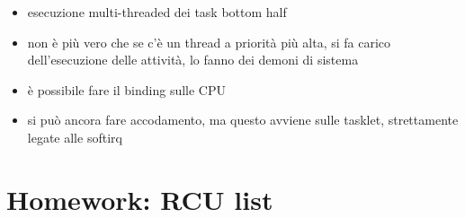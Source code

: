 \documentclass[12pt, oneside]{extbook}
\begin{document}
\begin{itemize}
\item esecuzione multi-threaded dei task bottom half
\item non è più vero che se c'è un thread a priorità più alta, si fa carico dell'esecuzione delle attività, lo fanno dei demoni di sistema
\item è possibile fare il binding sulle CPU
\item si può ancora fare accodamento, ma questo avviene sulle tasklet, strettamente legate alle softirq
\end{itemize}










\section*{Homework: RCU list}
\end{document}
